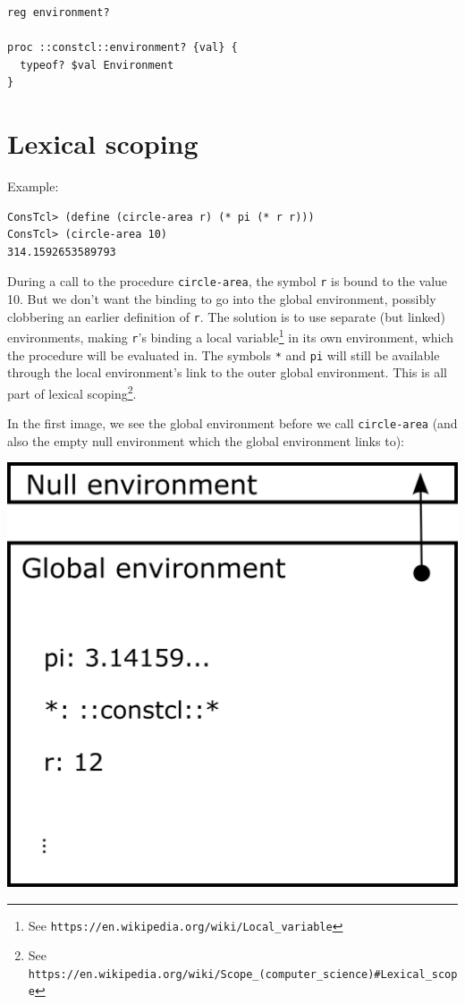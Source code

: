\documentclass[twoside]{report}
\begin{document}
\begin{lstlisting}
reg environment?

proc ::constcl::environment? {val} {
  typeof? $val Environment
}
\end{lstlisting}

\section{Lexical scoping}
\label{lexical-scoping}

Example:

\begin{verbatim}
ConsTcl> (define (circle-area r) (* pi (* r r)))
ConsTcl> (circle-area 10)
314.1592653589793
\end{verbatim}

During a call to the procedure \texttt{circle-area}, the symbol \texttt{r} is bound to the value 10. But we don't want the binding to go into the global environment, possibly clobbering an earlier definition of \texttt{r}. The solution is to use separate (but linked) environments, making \texttt{r}'s binding a local variable\footnote{See \texttt{https://en.wikipedia.org/wiki/Local\_variable}} in its own environment, which the procedure will be evaluated in. The symbols \texttt{*} and \texttt{pi} will still be available through the local environment's link to the outer global environment. This is all part of lexical scoping\footnote{See \texttt{https://en.wikipedia.org/wiki/Scope\_(computer\_science)\#Lexical\_scope}}.

In the first image, we see the global environment before we call \texttt{circle-area} (and also the empty null environment which the global environment links to):

\includegraphics{images/env1.png}
\end{document}
